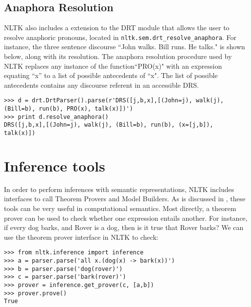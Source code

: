 \documentclass{article}
\newcommand{\dhgcode}[1]{{\tt #1}}
\begin{document}
\subsection{Anaphora Resolution}
NLTK also includes a extension to the DRT module that allows the user to resolve anaphoric pronouns, located in \dhgcode{nltk.sem.drt\_resolve\_anaphora}.  For instance, the three sentence discourse ``John walks.  Bill runs.  He talks." is shown below, along with its resolution.  The anaphora resolution procedure used by NLTK replaces any instance of the function``PRO(x)" with an expression equating ``x'' to a list of possible antecedents of ``x".  The list of possible antecedents contains any discourse referent in an accessible DRS.

\begin{verbatim}
>>> d = drt.DrtParser().parse(r'DRS([j,b,x],[(John=j), walk(j), 
(Bill=b), run(b), PRO(x), talk(x)])')
>>> print d.resolve_anaphora()
DRS([j,b,x],[(John=j), walk(j), (Bill=b), run(b), (x=[j,b]), 
talk(x)])
\end{verbatim}


\section{Inference tools}
In order to perform inferences with semantic representations, NLTK includes interfaces to call Theorem Provers and Model Builders.  As is discussed in \cite{BB}, these tools can be very useful in computational semantics.  Most directly, a theorem prover can be used to check whether one expression entails another.  For instance, if every dog barks, and Rover is a dog, then is it true that Rover barks?  We can use the theorem prover interface in NLTK to check:

\begin{verbatim}
>>> from nltk.inference import inference
>>> a = parser.parse('all x.(dog(x) -> bark(x))')
>>> b = parser.parse('dog(rover)')
>>> c = parser.parse('bark(rover)')
>>> prover = inference.get_prover(c, [a,b])
>>> prover.prove()
True
\end{verbatim}
\end{document}
